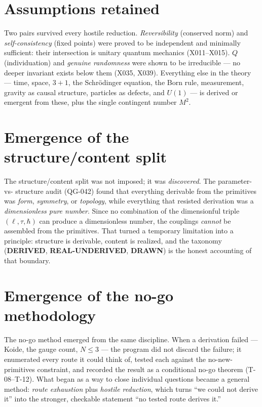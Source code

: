 \documentclass[10pt,twoside,openany]{book}
\newcommand{\derived}{\textbf{DERIVED}}
\newcommand{\realunder}{\textbf{REAL-UNDERIVED}}
\newcommand{\drawn}{\textbf{DRAWN}}
\begin{document}
\section{Assumptions retained}

Two pairs survived every hostile reduction. \emph{Reversibility} (conserved norm) and
\emph{self-consistency} (fixed points) were proved to be independent and minimally
sufficient: their intersection is unitary quantum mechanics (X011--X015). \emph{$Q$}
(individuation) and \emph{genuine randomness} were shown to be irreducible --- no deeper
invariant exists below them (X035, X039). Everything else in the theory --- time, space,
$3{+}1$, the Schr\"odinger equation, the Born rule, measurement, gravity as causal
structure, particles as defects, and $U(1)$ --- is derived or emergent from these, plus the
single contingent number $M^2$.

\section{Emergence of the structure/content split}

The structure/content split was not imposed; it was \emph{discovered}. The parameter-vs-
structure audit (QG-042) found that everything derivable from the primitives was
\emph{form}, \emph{symmetry}, or \emph{topology}, while everything that resisted derivation
was a \emph{dimensionless pure number}. Since no combination of the dimensionful triple
$(\ell,\tau,\hbar)$ can produce a dimensionless number, the couplings \emph{cannot} be
assembled from the primitives. That turned a temporary limitation into a principle:
structure is derivable, content is realized, and the taxonomy (\derived, \realunder,
\drawn) is the honest accounting of that boundary.

\section{Emergence of the no-go methodology}

The no-go method emerged from the same discipline. When a derivation failed --- Koide, the
gauge count, $N\le3$ --- the program did not discard the failure; it enumerated every route
it could think of, tested each against the no-new-primitives constraint, and recorded the
result as a conditional no-go theorem (T-08--T-12). What began as a way to close individual
questions became a general method: \emph{route exhaustion} plus \emph{hostile reduction},
which turns ``we could not derive it'' into the stronger, checkable statement ``no tested
route derives it.''
\end{document}
